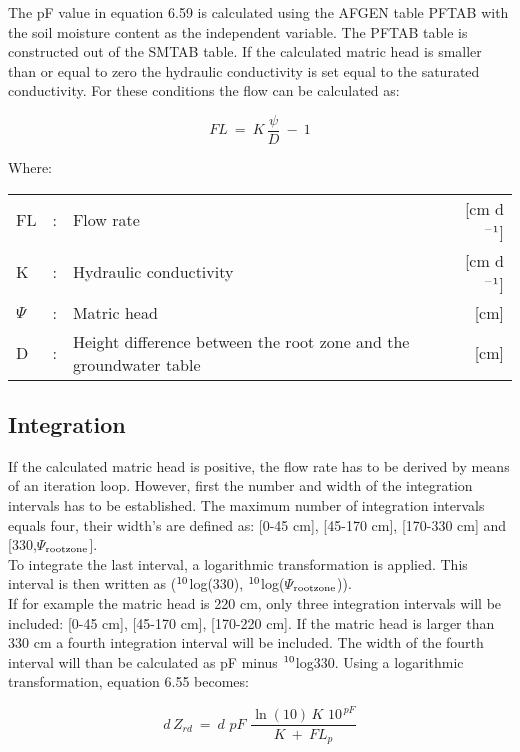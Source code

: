 The pF value in equation 6.59 is calculated using the AFGEN table PFTAB with the soil
moisture content as the independent variable. The PFTAB table is constructed out of the
SMTAB table. If the calculated matric head is smaller than or equal to zero the hydraulic
conduc\-tivity is set equal to the saturated conductivity. For these conditions the flow can
be calculat\-ed as:

\begin{equation}
FL~=~K\,{\frac{\psi }{D}} ~-~ 1
\end{equation}

Where:\\[5pt]
\begin{tabularx}{\textwidth}{llXr}
FL &:& Flow rate  & [cm d$^{{\rm -1}}$]\\
K  &:& Hydraulic conductivity  & [cm d$^{{\rm -1}}$]\\
$\Psi$ &:& Matric head  & [cm]\\
D &:& Height difference between the root zone and the groundwater table  & [cm]\\
\end{tabularx}

\subsection{Integration}
If the calculated matric head is positive, the flow rate has to be derived by means of an
iteration loop. However, first the number and width of the integration intervals has to be
established. The maximum number of integration intervals equals four, their width's are
defined as: [0-45 cm], [45-170 cm], [170-330 cm] and [330,$\Psi$$_{{\rm rootzone}}$].\\
To integrate the last interval, a logarithmic transformation is applied. This interval is then
written as ($^{{\rm 10}}$log(330), $^{{\rm 10}}$log($\Psi$$_{{\rm rootzone}}$)).\\
If for example the matric head is 220 cm, only three integration intervals will be
included: [0-45 cm], [45-170 cm], [170-220 cm]. If the matric head is larger than 330 cm
a fourth integration interval will be included. The width of the fourth interval will than be
calculated as pF minus $^{{\rm 10}}$log330. Using a logarithmic transformation, equation 6.55
becomes:

\begin{equation}
d\, Z _{rd} ~=~ d\,\, pF\,\,{\frac{\ln (10)\, K\,\, 10^{\, pF} }{K~+~FL _{p} }}
\end{equation}

